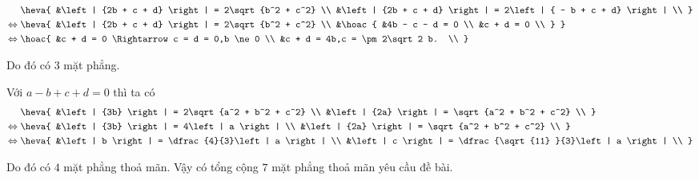 \begin{ex}
{\begin{align*}
		&\heva{
			&\left| {2b + c + d} \right| = 2\sqrt {b^2 + c^2} \\
			&\left| {2b + c + d} \right| = 2\left| { - b + c + d} \right| \\ 
		} \\
		\Leftrightarrow{} &\heva{
			&\left| {2b + c + d} \right| = 2\sqrt {b^2 + c^2} \\
			&\hoac{
				&4b - c - d = 0 \\
				&c + d = 0 \\ 
			}
		} \\
		\Leftrightarrow{} &\hoac{
			&c + d = 0 \Rightarrow c = d = 0,b \ne 0 \\
			&c + d = 4b,c =  \pm 2\sqrt 2 b. \\
		}
	\end{align*}
	
	\noindent Do đó có $3$ mặt phẳng.
	
	\noindent Với $a - b + c + d = 0$ thì ta có
	\begin{align*}
		&\heva{
			&\left| {3b} \right| = 2\sqrt {a^2 + b^2 + c^2} \\
			&\left| {2a} \right| = \sqrt {a^2 + b^2 + c^2} \\ 
		} \\
		\Leftrightarrow{} &\heva{
			&\left| {3b} \right| = 4\left| a \right| \\
			&\left| {2a} \right| = \sqrt {a^2 + b^2 + c^2}  \\ 
		} \\
		\Leftrightarrow{} &\heva{
			&\left| b \right| = \dfrac{4}{3}\left| a \right| \\
			&\left| c \right| = \dfrac{\sqrt {11} }{3}\left| a \right| \\ 
		}
	\end{align*}
	
	\noindent Do đó có $4$ mặt phẳng thoả mãn. Vậy có tổng cộng $7$ mặt phẳng thoả mãn yêu cầu đề bài.
	}
\end{ex}

